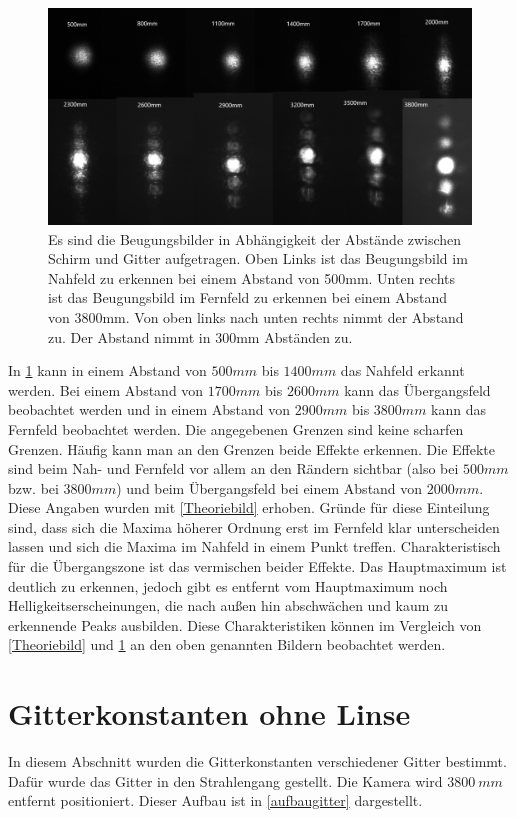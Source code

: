 \begin{figure}[h!]
	\centering
	\includegraphics[scale = 0.65]{alleabstande.png}
	\caption{Es sind die Beugungsbilder in Abhängigkeit der Abstände zwischen Schirm und Gitter aufgetragen. Oben Links ist das Beugungsbild im Nahfeld zu erkennen bei einem Abstand von 500mm. Unten rechts ist das Beugungsbild im Fernfeld zu erkennen bei einem Abstand von 3800mm. Von oben links nach unten rechts nimmt der Abstand zu. Der Abstand nimmt in 300mm Abständen zu.}
	\label{alle}
\end{figure}
In \cref{alle} kann in einem Abstand von $500 mm$ bis $1400 mm$ das Nahfeld erkannt werden. Bei einem Abstand von $1700 mm$ bis $2600 mm$  kann das Übergangsfeld beobachtet werden und in einem Abstand von $2900 mm$ bis $3800 mm$ kann das Fernfeld beobachtet werden. Die angegebenen Grenzen sind keine scharfen Grenzen. Häufig kann man an den Grenzen beide Effekte erkennen. Die Effekte sind beim Nah- und Fernfeld vor allem an den Rändern sichtbar (also bei $500 mm$ bzw. bei $3800 mm$) und beim Übergangsfeld bei einem Abstand von $2000 mm$. Diese Angaben wurden mit \cref{Theoriebild} erhoben. Gründe für diese Einteilung sind, dass sich die Maxima höherer Ordnung erst im Fernfeld klar unterscheiden lassen und sich die Maxima im Nahfeld in einem Punkt treffen. Charakteristisch für die Übergangszone ist das vermischen beider Effekte. Das Hauptmaximum ist deutlich zu erkennen, jedoch gibt es entfernt vom Hauptmaximum noch Helligkeitserscheinungen, die nach außen hin abschwächen und kaum zu erkennende Peaks ausbilden. Diese Charakteristiken können im Vergleich von \cref{Theoriebild} und \cref{alle} an den oben genannten Bildern beobachtet werden.

\section{Gitterkonstanten ohne Linse}
In diesem Abschnitt wurden die Gitterkonstanten verschiedener Gitter bestimmt. Dafür wurde das Gitter in den Strahlengang gestellt. Die Kamera wird $\SI{3800}{mm}$ entfernt positioniert. Dieser Aufbau ist in \cref{aufbaugitter} dargestellt.

